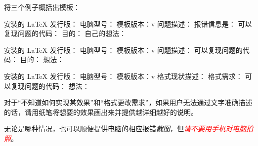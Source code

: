将三个例子概括出模板：

\begin{latexcode}
  安装的 LaTeX 发行版：
  电脑型号：
  模板版本：v
  问题描述：
  报错信息是：
  可以复现问题的代码：
  目的：
  自己的想法：
\end{latexcode}

\begin{latexcode}
  安装的 LaTeX 发行版：
  电脑型号：
  模板版本：v
  问题描述：
  可以复现问题的代码：
  目的：
  想法：
\end{latexcode}

\begin{latexcode}
  安装的 LaTeX 发行版：
  电脑型号：
  模板版本：v
  格式现状描述：
  格式需求：
  可以复现问题的代码：
  想法：
\end{latexcode}

对于“不知道如何实现某效果”和“格式更改需求”，如果用户无法通过文字准确描述的话，请用纸笔将想要的效果画出来并提供越详细越好的说明。

无论是哪种情况，也可以顺便提供电脑的相应报错\emph{截图}，但\textcolor{red}{\emph{请不要用手机对电脑拍照}}。